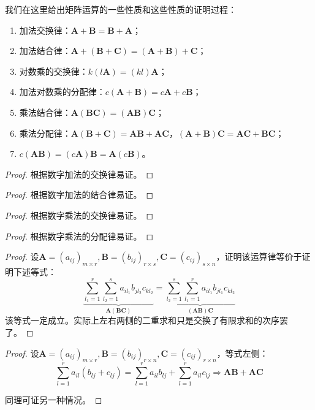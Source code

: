     我们在这里给出矩阵运算的一些性质和这些性质的证明过程：
    \begin{enumerate}
        \item 加法交换律：$\bm{A}+\bm{B}=\bm{B}+\bm{A}$；
        \item 加法结合律：$\bm{A}+(\bm{B}+\bm{C})=(\bm{A}+\bm{B})+\bm{C}$；
        \item 对数乘的交换律：$k(l\bm{A})=(kl)\bm{A}$；
        \item 加法对数乘的分配律：$c(\bm{A}+\bm{B})=c\bm{A}+c\bm{B}$；
        \item 乘法结合律：$\bm{A}(\bm{B}\bm{C})=(\bm{A}\bm{B})\bm{C}$；
        \item 乘法分配律：$\bm{A}(\bm{B}+\bm{C})=\bm{A}\bm{B}+\bm{A}\bm{C}$，$(\bm{A}+\bm{B})\bm{C}=\bm{A}\bm{C}+\bm{B}\bm{C}$；
        \item $c(\bm{A}\bm{B})=(c\bm{A})\bm{B}=\bm{A}(c\bm{B})$。
    \end{enumerate}

    \begin{proof}
        根据数字加法的交换律易证。
    \end{proof}

    \begin{proof}
        根据数字加法的结合律易证。
    \end{proof}

    \begin{proof}
        根据数字乘法的交换律易证。
    \end{proof}

    \begin{proof}
        根据数字乘法的分配律易证。
    \end{proof}

    \begin{proof}
        设$\bm{A}=(a_{ij})_{m\times r},\bm{B}=(b_{ij})_{r\times s},\bm{C}=(c_{ij})_{s\times n}$，证明该运算律等价于证明下述等式：
        \begin{equation}
            \label{eq:9}
            \underbrace{\sum_{l_1=1}^{r}\sum_{l_2=1}^{s}a_{il_1}b_{jl_2}c_{kl_2}}_{\bm{A}(\bm{B}\bm{C})}=\underbrace{\sum_{l_2=1}^{s}\sum_{l_1=1}^{r}a_{il_1}b_{jl_1}c_{kl_2}}_{(\bm{A}\bm{B})\bm{C}}
        \end{equation}
        该等式一定成立。实际上左右两侧的二重求和只是交换了有限求和的次序罢了。
    \end{proof}

    \begin{proof}
        设$\bm{A}=(a_{ij})_{m\times r},\bm{B}=(b_{ij})_{r\times n},\bm{C}=(c_{ij})_{r\times n}$，等式左侧：
        \begin{equation}
            \label{eq:10}
            \sum_{l=1}^{r}a_{il}(b_{lj}+c_{lj})=\sum_{l=1}^{r}a_{il}b_{lj}+\sum_{l=1}^{r}a_{il}c_{lj} \Rightarrow \bm{A}\bm{B}+\bm{A}\bm{C}
        \end{equation}

        同理可证另一种情况。
    \end{proof}


